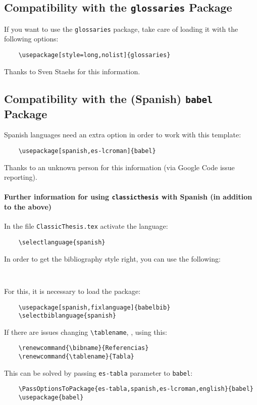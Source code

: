 \subsection*{Compatibility with the \texttt{glossaries} Package}
If you want to use the \texttt{glossaries} package, take care of loading it
with the following options:
\begin{verbatim}
    \usepackage[style=long,nolist]{glossaries}
\end{verbatim}
Thanks to Sven Staehs for this information.


\subsection*{Compatibility with the (Spanish) \texttt{babel} Package}
Spanish languages need an extra option in order to work with this template:
\begin{verbatim}
    \usepackage[spanish,es-lcroman]{babel}
\end{verbatim}
Thanks to an unknown person for this information (via Google Code issue reporting).


\paragraph{Further information for using \texttt{classicthesis} with Spanish (in addition to the above)}
In the file \texttt{ClassicThesis.tex} activate the language:
\begin{verbatim}
    \selectlanguage{spanish}
\end{verbatim}

In order to get the bibliography style right, you can use the following:
\begin{verbatim}
    
\end{verbatim}

For this, it is necessary to load the package:
\begin{verbatim}
    \usepackage[spanish,fixlanguage]{babelbib}
    \selectbiblanguage{spanish}
\end{verbatim}

If there are issues changing \verb|\tablename|, \eg, using this:
\begin{verbatim}
    \renewcommand{\bibname}{Referencias}
    \renewcommand{\tablename}{Tabla}
\end{verbatim}

This can be solved by passing \texttt{es-tabla} parameter to \texttt{babel}:
\begin{verbatim}
    \PassOptionsToPackage{es-tabla,spanish,es-lcroman,english}{babel}
    \usepackage{babel}
\end{verbatim}

